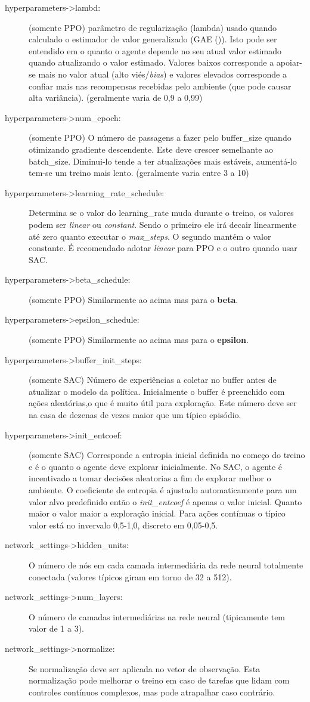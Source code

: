 \begin{description}
   \item [hyperparameters->lambd:] (somente PPO) parâmetro de regularização (lambda) usado quando calculado o estimador de valor generalizado (GAE ()). Isto pode ser entendido em o quanto o agente depende no seu atual valor estimado quando atualizando o valor estimado. Valores baixos corresponde a apoiar-se mais no valor atual (alto viés/\textit{bias}) e valores elevados corresponde a confiar mais nas recompensas recebidas pelo ambiente (que pode causar alta variância). (geralmente varia de 0,9 a 0,99)
   \item [hyperparameters->num\_epoch:] (somente PPO) O número de passagens a fazer pelo buffer\_size quando otimizando gradiente descendente. Este deve crescer semelhante ao batch\_size. Diminui-lo tende a ter atualizações mais estáveis, aumentá-lo tem-se um treino mais lento. (geralmente varia entre 3 a 10)
   \item [hyperparameters->learning\_rate\_schedule:] Determina se o valor do learning\_rate muda durante o treino, os valores podem ser \textit{linear} ou \textit{constant}. Sendo o primeiro ele irá decair linearmente até zero quanto executar o \textit{max\_steps}. O segundo mantém o valor constante. É recomendado adotar \textit{linear} para PPO e o outro quando usar SAC.
   \item [hyperparameters->beta\_schedule:] (somente PPO) Similarmente ao acima mas para o \textbf{beta}. 
   \item [hyperparameters->epsilon\_schedule:] (somente PPO) Similarmente ao acima mas para o \textbf{epsilon}. 
   \item [hyperparameters->buffer\_init\_steps:] (somente SAC) Número de experiências a coletar no buffer antes de atualizar o modelo da política. Inicialmente o buffer é preenchido com ações aleatórias,o que é muito útil para exploração. Este número deve ser na casa de dezenas de vezes maior que um típico episódio.
   \item [hyperparameters->init\_entcoef:] (somente SAC) Corresponde a entropia inicial definida no começo do treino e é o quanto o agente deve explorar inicialmente. No SAC, o agente é incentivado a tomar decisões aleatorias a fim de explorar melhor o ambiente. O coeficiente de entropia é ajustado automaticamente para um valor alvo predefinido então o \textit{init\_entcoef} é apenas o valor inicial. Quanto maior o valor maior a exploração inicial. Para ações contínuas o típico valor está no invervalo 0,5-1,0, discreto em 0,05-0,5.
   \item [network\_settings->hidden\_units:] O número de nós em cada camada intermediária da rede neural totalmente conectada (valores típicos giram em torno de 32 a 512).
   \item [network\_settings->num\_layers:] O número de camadas intermediárias na rede neural (tipicamente tem valor de 1 a 3).
   \item [network\_settings->normalize:] Se normalização deve ser aplicada no vetor de observação. Esta normalização pode melhorar o treino em caso de tarefas que lidam com controles contínuos complexos, mas pode atrapalhar caso contrário.
\end{description}


